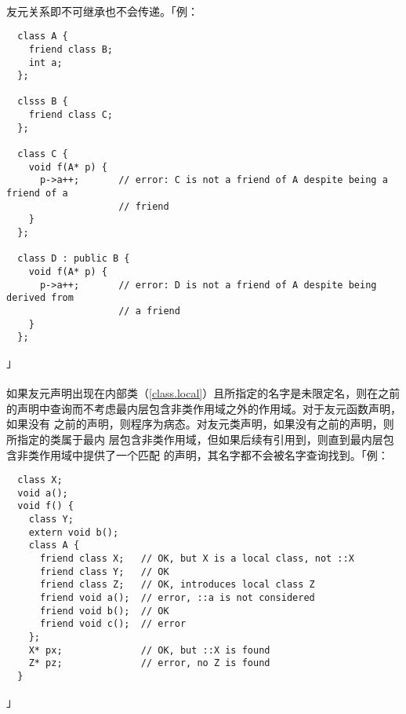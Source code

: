 \paragraph{}
友元关系即不可继承也不会传递。「例：
\begin{lstlisting}
  class A {
    friend class B;
    int a;
  };

  clsss B {
    friend class C;
  };

  class C {
    void f(A* p) {
      p->a++;       // error: C is not a friend of A despite being a friend of a
                    // friend
    }
  };

  class D : public B {
    void f(A* p) {
      p->a++;       // error: D is not a friend of A despite being derived from
                    // a friend
    }
  };
\end{lstlisting}」

\paragraph{}
如果友元声明出现在内部类（\ref{class.local}）且所指定的名字是未限定名，则在之前
的声明中查询而不考虑最内层包含非类作用域之外的作用域。对于友元函数声明，如果没有
之前的声明，则程序为病态。对友元类声明，如果没有之前的声明，则所指定的类属于最内
层包含非类作用域，但如果后续有引用到，则直到最内层包含非类作用域中提供了一个匹配
的声明，其名字都不会被名字查询找到。「例：
\begin{lstlisting}
  class X;
  void a();
  void f() {
    class Y;
    extern void b();
    class A {
      friend class X;   // OK, but X is a local class, not ::X
      friend class Y;   // OK
      friend class Z;   // OK, introduces local class Z
      friend void a();  // error, ::a is not considered
      friend void b();  // OK
      friend void c();  // error
    };
    X* px;              // OK, but ::X is found
    Z* pz;              // error, no Z is found
  }
\end{lstlisting}」

